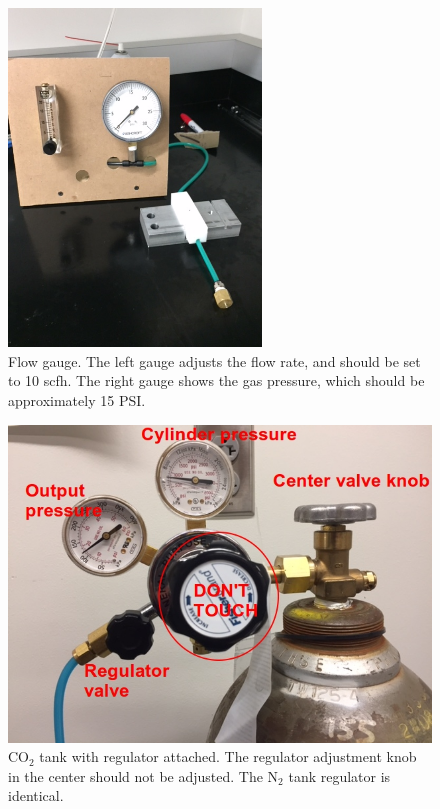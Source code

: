 \documentclass[letterpaper,12pt]{article}
\begin{document}
\begin{figure}
	\centering
	\includegraphics[width=0.6\textwidth,angle=-90]{flow_gauge}
	\caption{Flow gauge. The left gauge adjusts the flow rate, and should be set to 10 scfh. The right gauge shows the gas pressure, which should be approximately 15 PSI.}
	\label{flow gauge}
\end{figure}

\begin{figure}
	\center
	\includegraphics[scale=0.5]{co2tank}
	\caption{CO$_2$ tank with regulator attached. The regulator adjustment knob in the center should not be adjusted. The N$_2$ tank regulator is identical.} \label{co2tank}
\end{figure}
\end{document}
